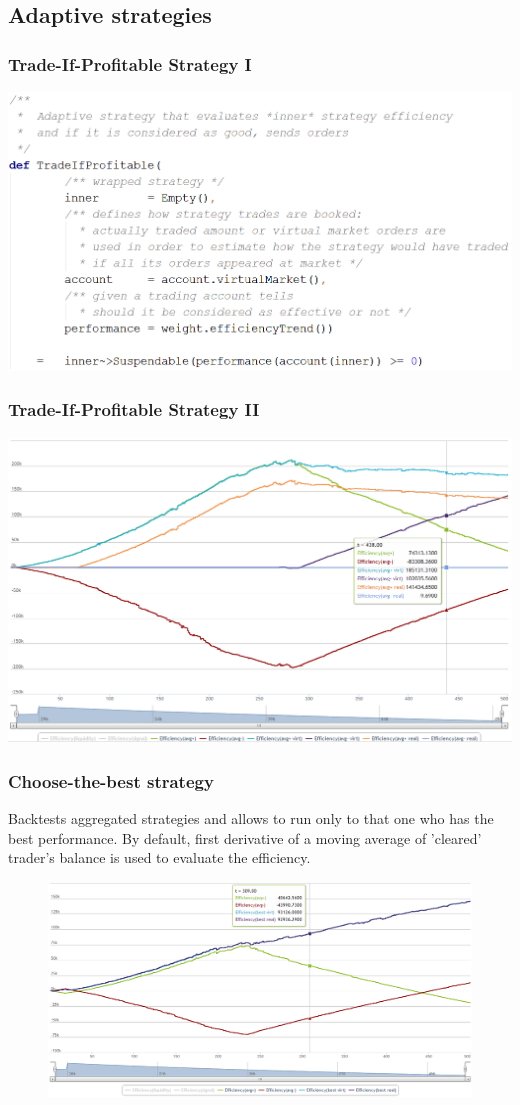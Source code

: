 \documentclass{beamer}
\begin{document}
\subsection{Adaptive strategies}
\begin{frame}
\frametitle{Trade-If-Profitable Strategy I}
\includegraphics[width=1\linewidth]{tradeifprofitable_strategy.png}
\end{frame}
\begin{frame}
\frametitle{Trade-If-Profitable Strategy II}
\includegraphics[width=1\linewidth]{tradeifprofitable.png}
\end{frame}
\begin{frame}
\frametitle{Choose-the-best strategy}
Backtests aggregated strategies and allows to run only to that one who has the best performance. By default, first derivative of a moving average of 'cleared' trader's balance is used to evaluate the efficiency.
\begin{figure}[htbp]
\centering
\includegraphics[width=1\linewidth]{choosethebest.png}
\end{figure}
\end{frame}
\end{document}

